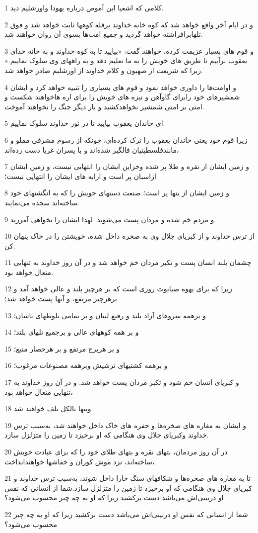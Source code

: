 \par 1 کلامی که اشعیا ابن آموص درباره یهودا واورشلیم دید.
\par 2 و در ایام آخر واقع خواهد شد که کوه خانه خداوند برقله کوهها ثابت خواهد شد و فوق تلهابرافراشته خواهد گردید و جمیع امت‌ها بسوی آن روان خواهند شد.
\par 3 و قوم های بسیار عزیمت کرده، خواهند گفت: «بیایید تا به کوه خداوند و به خانه خدای یعقوب برآییم تا طریق های خویش را به ما تعلیم دهد و به راههای وی سلوک نماییم.» زیرا که شریعت از صهیون و کلام خداوند از اورشلیم صادر خواهد شد.
\par 4 و اوامت‌ها را داوری خواهد نمود و قوم های بسیاری را تنبیه خواهد کرد و ایشان شمشیرهای خود رابرای گاوآهن و نیزه های خویش را برای اره هاخواهند شکست و امتی بر امتی شمشیر نخواهدکشید و بار دیگر جنگ را نخواهند آموخت.
\par 5 ‌ای خاندان یعقوب بیایید تا در نور خداوند سلوک نماییم.
\par 6 زیرا قوم خود یعنی خاندان یعقوب را ترک کرده‌ای، چونکه از رسوم مشرقی مملو و مانندفلسطینیان فالگیر شده‌اند و با پسران غربا دست زده‌اند،
\par 7 و زمین ایشان از نقره و طلا پر شده وخزاین ایشان را انتهایی نیست، و زمین ایشان ازاسبان پر است و ارابه های ایشان را انتهایی نیست؛
\par 8 و زمین ایشان از بتها پر است؛ صنعت دستهای خویش را که به انگشتهای خود ساخته‌اند سجده می‌نمایند.
\par 9 و مردم خم شده و مردان پست می‌شوند. لهذا ایشان را نخواهی آمرزید.
\par 10 از ترس خداوند و از کبریای جلال وی به صخره داخل شده، خویشتن را در خاک پنهان کن.
\par 11 چشمان بلند انسان پست و تکبر مردان خم خواهد شد و در آن روز خداوند به تنهایی متعال خواهد بود.
\par 12 زیرا که برای یهوه صبایوت روزی است که بر هرچیز بلند و عالی خواهد آمد و برهرچیز مرتفع، و آنها پست خواهد شد؛
\par 13 و برهمه سروهای آزاد بلند و رفیع لبنان و بر تمامی بلوطهای باشان؛
\par 14 و بر همه کوههای عالی و برجمیع تلهای بلند؛
\par 15 و بر هربرج مرتفع و بر هرحصار منیع؛
\par 16 و برهمه کشتیهای ترشیش وبرهمه مصنوعات مرغوب؛
\par 17 و کبریای انسان خم شود و تکبر مردان پست خواهد شد. و در آن روز خداوند به تنهایی متعال خواهد بود،
\par 18 وبتها بالکل تلف خواهند شد.
\par 19 و ایشان به مغاره های صخره‌ها و حفره های خاک داخل خواهند شد، به‌سبب ترس خداوند وکبریای جلال وی هنگامی که او برخیزد تا زمین را متزلزل سازد.
\par 20 در آن روز مردمان، بتهای نقره و بتهای طلای خود را که برای عبادت خویش ساخته‌اند، نزد موش کوران و خفاشها خواهندانداخت،
\par 21 تا به مغاره های صخره‌ها و شکافهای سنگ خارا داخل شوند، به‌سبب ترس خداوند و کبریای جلال وی هنگامی که او برخیزد تا زمین را متزلزل سازد.شما از انسانی که نفس او دربینی‌اش می‌باشد دست برکشید زیرا که او به چه چیز محسوب می‌شود؟
\par 22 شما از انسانی که نفس او دربینی‌اش می‌باشد دست برکشید زیرا که او به چه چیز محسوب می‌شود؟
 
